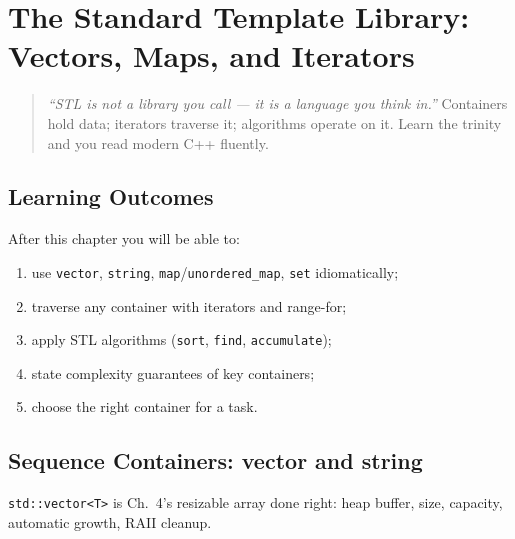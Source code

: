 \chapter{The Standard Template Library: Vectors, Maps, and Iterators}
\label{ch:stl}

\begin{quote}
\emph{``STL is not a library you call --- it is a language you think in.''} Containers hold data; iterators traverse it; algorithms operate on it. Learn the trinity and you read modern C++ fluently.
\end{quote}

\noindent{}

\section*{Learning Outcomes}
After this chapter you will be able to:
\begin{enumerate}[label=(L\arabic*)]
    \item use \texttt{vector}, \texttt{string}, \texttt{map}/\texttt{unordered\_map}, \texttt{set} idiomatically;
    \item traverse any container with iterators and range-for;
    \item apply STL algorithms (\texttt{sort}, \texttt{find}, \texttt{accumulate});
    \item state complexity guarantees of key containers;
    \item choose the right container for a task.
\end{enumerate}

\section{Sequence Containers: vector and string}
\label{sec:vector-string}
\texttt{std::vector<T>} is Ch.~4's resizable array done right: heap buffer, size, capacity, automatic growth, RAII cleanup.

